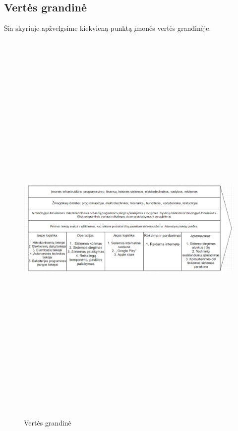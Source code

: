 \documentclass[oneside]{VUMIFPSkursinis}
\begin{document}
	\subsection{Vertės grandinė}
Šia skyriuje apžvelgsime kiekvieną punktą įmonės vertės grandinėje.
\begin{figure}[H]
		\centering	
	\includegraphics[width=18cm,height=20cm,keepaspectratio]{ValueChain.png}
	\caption{Vertės grandinė}
	\label{fig:VertėsGrandinė}
\end{figure}
\end{document}
